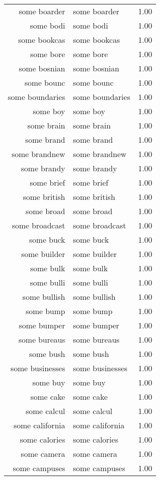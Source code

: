 \begin{table}[ht]
\begin{tabular}{rlr}
  some boarder & some boarder & 1.00 \\ 
  some bodi & some bodi & 1.00 \\ 
  some bookcas & some bookcas & 1.00 \\ 
  some bore & some bore & 1.00 \\ 
  some bosnian & some bosnian & 1.00 \\ 
  some bounc & some bounc & 1.00 \\ 
  some boundaries & some boundaries & 1.00 \\ 
  some boy & some boy & 1.00 \\ 
  some brain & some brain & 1.00 \\ 
  some brand & some brand & 1.00 \\ 
  some brandnew & some brandnew & 1.00 \\ 
  some brandy & some brandy & 1.00 \\ 
  some brief & some brief & 1.00 \\ 
  some british & some british & 1.00 \\ 
  some broad & some broad & 1.00 \\ 
  some broadcast & some broadcast & 1.00 \\ 
  some buck & some buck & 1.00 \\ 
  some builder & some builder & 1.00 \\ 
  some bulk & some bulk & 1.00 \\ 
  some bulli & some bulli & 1.00 \\ 
  some bullish & some bullish & 1.00 \\ 
  some bump & some bump & 1.00 \\ 
  some bumper & some bumper & 1.00 \\ 
  some bureaus & some bureaus & 1.00 \\ 
  some bush & some bush & 1.00 \\ 
  some businesses & some businesses & 1.00 \\ 
  some buy & some buy & 1.00 \\ 
  some cake & some cake & 1.00 \\ 
  some calcul & some calcul & 1.00 \\ 
  some california & some california & 1.00 \\ 
  some calories & some calories & 1.00 \\ 
  some camera & some camera & 1.00 \\ 
  some campuses & some campuses & 1.00 \\ 

\end{tabular}
\end{table}
